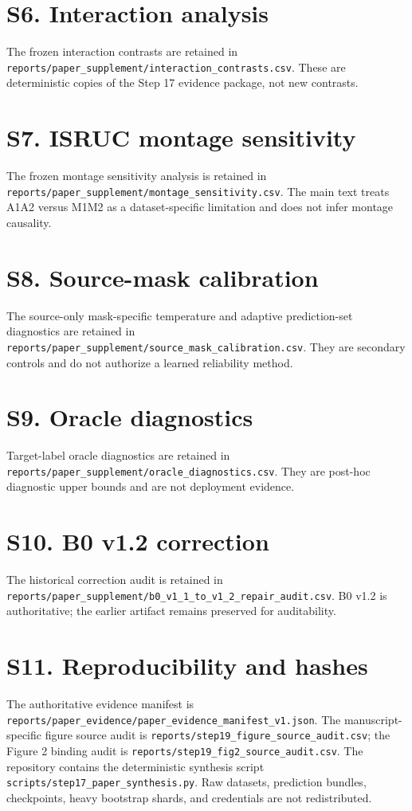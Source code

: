 \documentclass[10pt]{article}
\begin{document}
\section*{S6. Interaction analysis}
The frozen interaction contrasts are retained in \texttt{reports/paper\_supplement/interaction\_contrasts.csv}. These are deterministic copies of the Step 17 evidence package, not new contrasts.

\section*{S7. ISRUC montage sensitivity}
The frozen montage sensitivity analysis is retained in \texttt{reports/paper\_supplement/montage\_sensitivity.csv}. The main text treats A1A2 versus M1M2 as a dataset-specific limitation and does not infer montage causality.

\section*{S8. Source-mask calibration}
The source-only mask-specific temperature and adaptive prediction-set diagnostics are retained in \texttt{reports/paper\_supplement/source\_mask\_calibration.csv}. They are secondary controls and do not authorize a learned reliability method.

\section*{S9. Oracle diagnostics}
Target-label oracle diagnostics are retained in \texttt{reports/paper\_supplement/oracle\_diagnostics.csv}. They are post-hoc diagnostic upper bounds and are not deployment evidence.

\section*{S10. B0 v1.2 correction}
The historical correction audit is retained in \texttt{reports/paper\_supplement/b0\_v1\_1\_to\_v1\_2\_repair\_audit.csv}. B0 v1.2 is authoritative; the earlier artifact remains preserved for auditability.

\section*{S11. Reproducibility and hashes}
The authoritative evidence manifest is \texttt{reports/paper\_evidence/paper\_evidence\_manifest\_v1.json}. The manuscript-specific figure source audit is \texttt{reports/step19\_figure\_source\_audit.csv}; the Figure 2 binding audit is \texttt{reports/step19\_fig2\_source\_audit.csv}. The repository contains the deterministic synthesis script \texttt{scripts/step17\_paper\_synthesis.py}. Raw datasets, prediction bundles, checkpoints, heavy bootstrap shards, and credentials are not redistributed.
\end{document}
